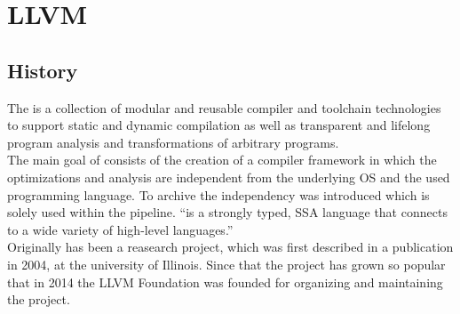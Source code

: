\chapter{LLVM}
\section{History}
The \llvm is a collection of modular and reusable compiler and toolchain technologies to support static and dynamic compilation as well as transparent and lifelong program analysis and transformations of arbitrary programs. \cite{LLVMWebsite, LLVMResearchBeginning}\\
The main goal of \llvm consists of the creation of a compiler framework in which the optimizations and analysis are independent from the underlying OS and the used programming language.
To archive the independency \llvmir was introduced which is solely used within the pipeline.
\enquote{\llvmir is a strongly typed, \ac{SSA} language that connects to a wide variety of high-level languages.} \cite{PolyhedralEmpiricalStudy}\\
Originally \llvm has been a reasearch project, which was first described in a publication in 2004, at the university of Illinois.
Since that the project has grown so popular that in 2014 the LLVM Foundation was founded for organizing and maintaining the project. \cite{LLVMFoundation}\\

